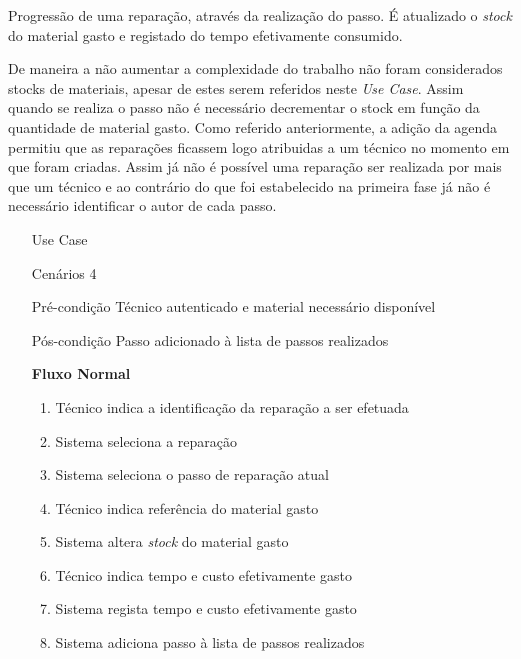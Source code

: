 \documentclass[../relatorio.tex]{subfiles}
\begin{document}
Progressão de uma reparação, através da realização do passo.
É atualizado o \textit{stock} do material gasto e registado do tempo efetivamente consumido.

De maneira a não aumentar a complexidade do trabalho não foram considerados stocks de materiais, apesar de estes serem referidos neste \textit{Use Case}.
Assim quando se realiza o passo não é necessário decrementar o stock em função da quantidade de material gasto.
Como referido anteriormente, a adição da agenda permitiu que as reparações ficassem logo atribuidas a um técnico no momento em que foram criadas. Assim
já não é possível uma reparação ser realizada por mais que um técnico e ao contrário do que foi estabelecido na primeira fase já não é necessário identificar 
o autor de cada passo.
\begin{itemize}
    \item[Use Case] {\underline{}}
    \item[Cenários] {4}
    \item[Pré-condição] {Técnico autenticado e material necessário disponível}
    \item[Pós-condição] {Passo adicionado à lista de passos realizados}
          \begin{flushleft}
              \textbf{Fluxo Normal}
          \end{flushleft}
          \begin{enumerate}
              \item Técnico indica a identificação da reparação a ser efetuada 
              \item Sistema seleciona a reparação
              \item Sistema seleciona o passo de reparação atual
              \item Técnico indica referência do material gasto
              \item Sistema altera \textit{stock} do material gasto
              \item Técnico indica tempo e custo efetivamente gasto 
              \item Sistema regista tempo e custo efetivamente gasto
              \item Sistema adiciona passo à lista de passos realizados
          \end{enumerate}
\end{itemize}
\end{document}
